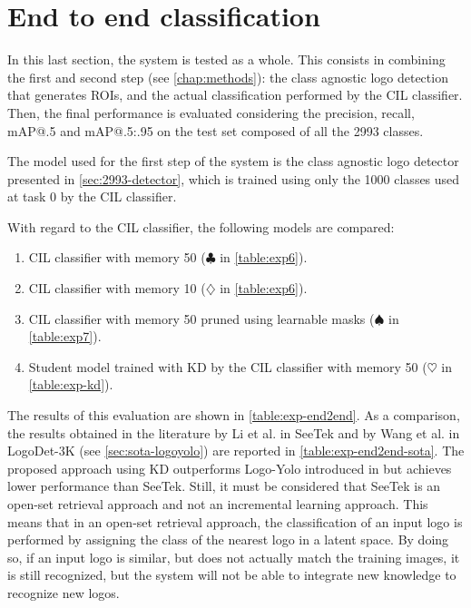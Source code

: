 \section{End to end classification}
\label{sec:exp-end2end}
In this last section, the system is tested as a whole.
This consists in combining the first and second step (see \autoref{chap:methods}): the class agnostic logo detection that generates ROIs, and the actual classification performed by the CIL classifier.
Then, the final performance is evaluated considering the precision, recall, mAP@.5 and mAP@.5:.95 on the test set composed of all the 2993 classes.

The model used for the first step of the system is the class agnostic logo detector presented in \autoref{sec:2993-detector}, which is trained using only the 1000 classes used at task 0 by the CIL classifier.

With regard to the CIL classifier, the following models are compared:
\begin{enumerate}
    \item CIL classifier with memory 50 ($\clubsuit$ in \autoref{table:exp6}).
    \item CIL classifier with memory 10 ($\diamondsuit$ in \autoref{table:exp6}).
    \item CIL classifier with memory 50 pruned using learnable masks ($\spadesuit$ in \autoref{table:exp7}).
    \item Student model trained with KD by the CIL classifier with memory 50 ($\heartsuit$ in \autoref{table:exp-kd}).
\end{enumerate}

The results of this evaluation are shown in \autoref{table:exp-end2end}. As a comparison, the results obtained in the literature by Li et al. in SeeTek \cite{li2022seetek} and by Wang et al. in LogoDet-3K \cite{wang2022logodet} (see \autoref{sec:sota-logoyolo}) are reported in \autoref{table:exp-end2end-sota}. The proposed approach using KD outperforms Logo-Yolo introduced in \cite{wang2022logodet} but achieves lower performance than SeeTek.
Still, it must be considered that SeeTek is an open-set retrieval approach and not an incremental learning approach.
This means that in an open-set retrieval approach, the classification of an input logo is performed by assigning the class of the nearest logo in a latent space. By doing so, if an input logo is similar, but does not actually match the training images, it is still recognized, but the system will not be able to integrate new knowledge to recognize new logos.

